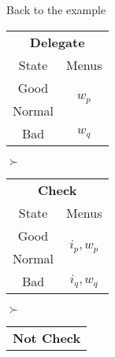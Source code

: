 \documentclass[usenames,dvipsnames,aspectratio=169,11pt, envcountsect, handout]{beamer}
\begin{document}
\begin{frame}{Back to the example}

	\begin{table}[H]
		\centering
		\begin{minipage}{0.29\textwidth}
			\centering
			\begin{tabular}{c | c}
				\multicolumn{2}{c}{\textbf{Delegate}}                           \\
				State                & Menus                                    \\
				\hline
				{\color{blue}Good}   & \multirow{2}{*}{{\color{blue}\( w_p \)}} \\
				{\color{blue}Normal} &                                          \\
				\hline
				Bad                  & \( w_q \)                                \\
			\end{tabular}
			\vspace{0.5cm} %
		\end{minipage}\hspace{0.3cm} %
		\( \succ \) %
		\begin{minipage}{0.29\textwidth}
			\centering
			\begin{tabular}{c | c}
				\multicolumn{2}{c}{\textbf{Check}}                                     \\
				State                & Menus                                           \\
				\hline
				{\color{blue}Good}   & \multirow{2}{*}{{\color{blue}\( i_{p}, w_p \)}} \\
				{\color{blue}Normal} &                                                 \\
				\hline
				Bad                  & \(  i_{q}, w_q \)                               \\
			\end{tabular}
			\vspace{0.5cm} %
		\end{minipage}\hspace{0.3cm} %
		\( \succ \) %
		\begin{minipage}{0.29\textwidth}
			\centering
			\begin{tabular}{c | c}
				\multicolumn{2}{c}{\textbf{Not Check}}   \\

\end{tabular}
\end{minipage}
\end{table}
\end{frame}
\end{document}
